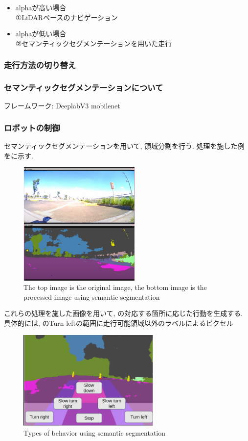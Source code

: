 \documentclass[uplatex, twocolumn, 9pt]{jsproceedings}
\begin{document}
\begin{itemize}
  \item alphaが高い場合\\
  ①LiDARベースのナビゲーション
  \item alphaが低い場合\\
  ②セマンティックセグメンテーションを用いた走行
\end{itemize}

\subsubsection{走行方法の切り替え}
\subsubsection{セマンティックセグメンテーションについて}
フレームワーク: DeeplabV3 mobilenet
\subsubsection{ロボットの制御}
セマンティックセグメンテーションを用いて, 領域分割を行う. 処理を施した例をに示す.

\begin{figure}[h]
  \centering
  \includegraphics[width=60mm]{fig/camera_for_seg.pdf}
  \caption{The top image is the original image, the bottom image is the processed image using semantic segmentation}
  \label{fig:for_seg}%
\end{figure}

これらの処理を施した画像を用いて, の対応する箇所に応じた行動を生成する. 具体的には, のTurn leftの範囲に走行可能領域以外のラベルによるピクセル

\begin{figure}[h]
  \centering
  \includegraphics[width=70mm]{fig/seg.pdf}
  \caption{Types of behavior using semantic segmentation}
  \label{fig:seg}%
\end{figure}
\end{document}
